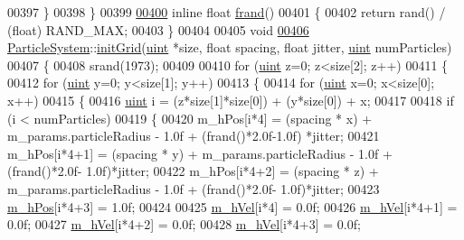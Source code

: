 \begin{DoxyCode}
{{{{{00397     \}
00398 \}
00399 
\hypertarget{particle_system_8cpp_source_l00400}{}\hyperlink{particle_system_8cpp_a5459f6b6b39f9a6b80de7f17c3777ee2}{00400} \textcolor{keyword}{inline} \textcolor{keywordtype}{float} \hyperlink{particle_system_8cpp_a5459f6b6b39f9a6b80de7f17c3777ee2}{frand}()
00401 \{
00402     \textcolor{keywordflow}{return} rand() / (\textcolor{keywordtype}{float}) RAND\_MAX;
00403 \}
00404 
00405 \textcolor{keywordtype}{void}
\hypertarget{particle_system_8cpp_source_l00406}{}\hyperlink{class_particle_system_a2e08c4e354b0de5e2dc468a0fb457dfe}{00406} \hyperlink{class_particle_system}{ParticleSystem}::\hyperlink{class_particle_system_a2e08c4e354b0de5e2dc468a0fb457dfe}{initGrid}(\hyperlink{particles__kernel_8cuh_a91ad9478d81a7aaf2593e8d9c3d06a14}{uint} *size, \textcolor{keywordtype}{float} spacing, \textcolor{keywordtype}{float} jitter, 
      \hyperlink{particles__kernel_8cuh_a91ad9478d81a7aaf2593e8d9c3d06a14}{uint} numParticles)
00407 \{
00408     srand(1973);
00409 
00410     \textcolor{keywordflow}{for} (\hyperlink{particles__kernel_8cuh_a91ad9478d81a7aaf2593e8d9c3d06a14}{uint} z=0; z<size[2]; z++)
00411     \{
00412         \textcolor{keywordflow}{for} (\hyperlink{particles__kernel_8cuh_a91ad9478d81a7aaf2593e8d9c3d06a14}{uint} y=0; y<size[1]; y++)
00413         \{
00414             \textcolor{keywordflow}{for} (\hyperlink{particles__kernel_8cuh_a91ad9478d81a7aaf2593e8d9c3d06a14}{uint} x=0; x<size[0]; x++)
00415             \{
00416                 \hyperlink{particles__kernel_8cuh_a91ad9478d81a7aaf2593e8d9c3d06a14}{uint} i = (z*size[1]*size[0]) + (y*size[0]) + x;
00417 
00418                 \textcolor{keywordflow}{if} (i < numParticles)
00419                 \{
00420                     m\_hPos[i*4] = (spacing * x) + m\_params.particleRadius - 1.0f + (frand()*2.0f-1.0f)
      *jitter;
00421                     m\_hPos[i*4+1] = (spacing * y) + m\_params.particleRadius - 1.0f + (frand()*2.0f-
      1.0f)*jitter;
00422                     m\_hPos[i*4+2] = (spacing * z) + m\_params.particleRadius - 1.0f + (frand()*2.0f-
      1.0f)*jitter;
00423                     \hyperlink{class_particle_system_ab9d75471d2eaaeb8fa98d2f3f47d9c25}{m\_hPos}[i*4+3] = 1.0f;
00424 
00425                     \hyperlink{class_particle_system_a20560c896ee8a8bbc827a8e5902da7e2}{m\_hVel}[i*4] = 0.0f;
00426                     \hyperlink{class_particle_system_a20560c896ee8a8bbc827a8e5902da7e2}{m\_hVel}[i*4+1] = 0.0f;
00427                     \hyperlink{class_particle_system_a20560c896ee8a8bbc827a8e5902da7e2}{m\_hVel}[i*4+2] = 0.0f;
00428                     \hyperlink{class_particle_system_a20560c896ee8a8bbc827a8e5902da7e2}{m\_hVel}[i*4+3] = 0.0f;
}}}}}
\end{DoxyCode}
